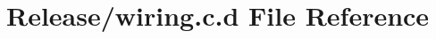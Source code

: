 \hypertarget{_release_2wiring_8c_8d}{\section{\-Release/wiring.c.\-d \-File \-Reference}
\label{_release_2wiring_8c_8d}
}
